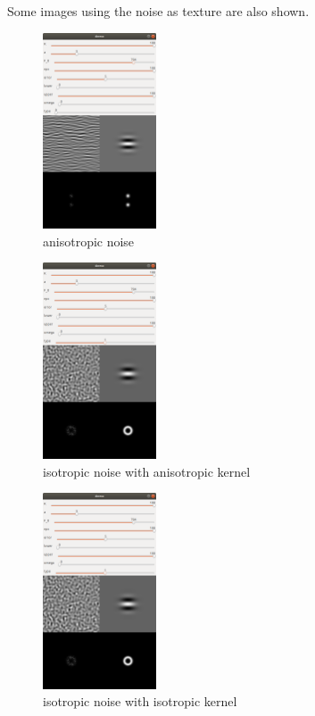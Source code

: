 \documentclass[journal, a4paper]{IEEEtran}
\begin{document}
  Some images using the noise as texture are also shown.  
  
  \begin{figure}[!hbt]
    \centering
    \includegraphics[width=0.3\textwidth]{ani.png}
    \caption{anisotropic noise}
  \end{figure}

  \begin{figure}[!hbt]
    \centering
    \includegraphics[width=0.3\textwidth]{iso.png}
    \caption{isotropic noise with anisotropic kernel}
  \end{figure}

  \begin{figure}[!hbt]
    \centering
    \includegraphics[width=0.3\textwidth]{iso.png}
    \caption{isotropic noise with isotropic kernel}
  \end{figure}
\end{document}
